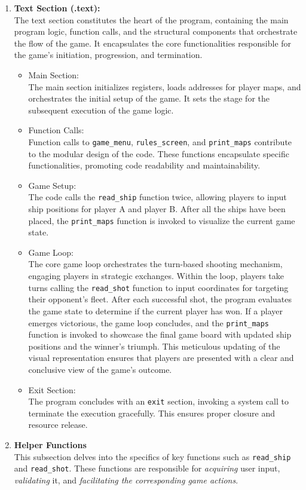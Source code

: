 \begin{enumerate}
    \item \textbf{Text Section (.text):} \\
    The text section constitutes the heart of the program, containing the main program logic, function calls, and the structural components that orchestrate the flow of the game. It encapsulates the core functionalities responsible for the game's initiation, progression, and termination.
        \begin{itemize}
            \item Main Section:\\
            The main section initializes registers, loads addresses for player maps, and orchestrates the initial setup of the game. It sets the stage for the subsequent execution of the game logic.
            \item Function Calls:\\
            Function calls to \texttt{game\_menu}, \texttt{rules\_screen}, and \texttt{print\_maps} contribute to the modular design of the code. These functions encapsulate specific functionalities, promoting code readability and maintainability.
            \item Game Setup:\\
            The code calls the \texttt{read\_ship} function twice, allowing players to input ship positions for player A and player B. After all the ships have been placed, the \texttt{print\_maps} function is invoked to visualize the current game state.
            \item Game Loop:\\
            The core game loop orchestrates the turn-based shooting mechanism, engaging players in strategic exchanges. Within the loop, players take turns calling the \texttt{read\_shot} function to input coordinates for targeting their opponent's fleet. After each successful shot, the program evaluates the game state to determine if the current player has won. If a player emerges victorious, the game loop concludes, and the \texttt{print\_maps} function is invoked to showcase the final game board with updated ship positions and the winner's triumph. This meticulous updating of the visual representation ensures that players are presented with a clear and conclusive view of the game's outcome.
            \item Exit Section:\\
            The program concludes with an \texttt{exit} section, invoking a system call to terminate the execution gracefully. This ensures proper closure and resource release.
        \end{itemize}

    \item \textbf{Helper Functions} \\
    This subsection delves into the specifics of key functions such as \texttt{read\_ship} and \texttt{read\_shot}. These functions are responsible for \textit{acquiring} user input, \textit{validating} it, and \textit{facilitating the corresponding game actions}.
\end{enumerate}

